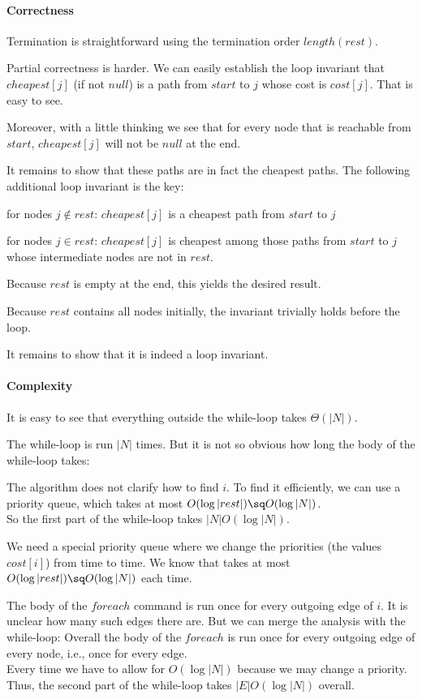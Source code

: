 \paragraph{Correctness}
Termination is straightforward using the termination order $length(rest)$.
\medskip

Partial correctness is harder.
We can easily establish the loop invariant that $cheapest[j]$ (if not $null$) is a path from $start$ to $j$ whose cost is $cost[j]$.
That is easy to see.

Moreover, with a little thinking we see that for every node that is reachable from $start$, $cheapest[j]$ will not be $null$ at the end.

It remains to show that these paths are in fact the cheapest paths.
The following additional loop invariant is the key:
\begin{compactitem}
 \item for nodes $j\nin rest$: $cheapest[j]$ is a cheapest path from $start$ to $j$
 \item for nodes $j\in rest$: $cheapest[j]$ is cheapest among those paths from $start$ to $j$ whose intermediate nodes are not in $rest$.
\end{compactitem} 
Because $rest$ is empty at the end, this yields the desired result.

Because $rest$ contains all nodes initially, the invariant trivially holds before the loop.

It remains to show that it is indeed a loop invariant.

\paragraph{Complexity}
It is easy to see that everything outside the while-loop takes $\Theta(|N|)$.

The while-loop is run $|N|$ times.
But it is not so obvious how long the body of the while-loop takes:
\begin{compactitem}
 \item The algorithm does not clarify how to find $i$. To find it efficiently, we can use a priority queue, which takes at most $O(\log|rest|)\sq O(\log|N|)$.\\
 So the first part of the while-loop takes $|N|O(\log|N|)$.
 \item We need a special priority queue where we change the priorities (the values $cost[i]$) from time to time.
  We know that takes at most $O(\log |rest|)\sq O(\log|N|)$ each time.
 \item The body of the $foreach$ command is run once for every outgoing edge of $i$.
 It is unclear how many such edges there are.
 But we can merge the analysis with the while-loop: Overall the body of the $foreach$ is run once for every outgoing edge of every node, i.e., once for every edge.\\
 Every time we have to allow for $O(\log|N|)$ because we may change a priority.\\
 Thus, the second part of the while-loop takes $|E|O(\log|N|)$ overall.
\end{compactitem}

